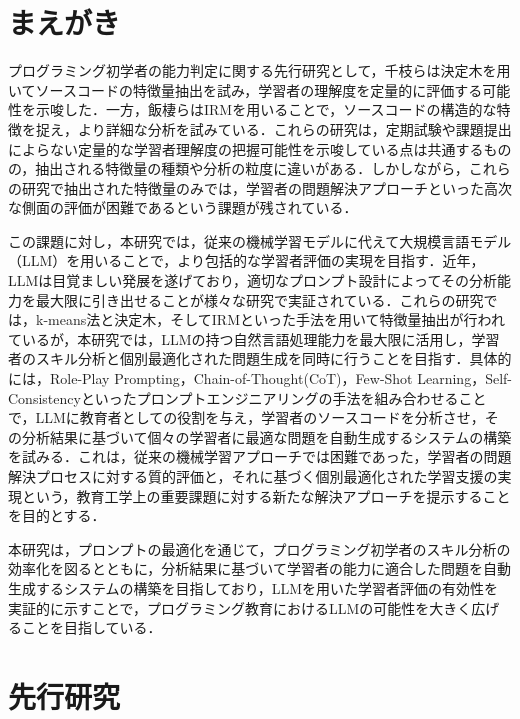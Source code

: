 \documentclass[11pt]{jreport}
\begin{document}
\chapter{まえがき}
プログラミング初学者の能力判定に関する先行研究として，千枝ら\cite{chieda}は決定木を用いてソースコードの特徴量抽出を試み，学習者の理解度を定量的に評価する可能性を示唆した．一方，飯棲ら\cite{izumi}はIRMを用いることで，ソースコードの構造的な特徴を捉え，より詳細な分析を試みている．これらの研究は，定期試験や課題提出によらない定量的な学習者理解度の把握可能性を示唆している点は共通するものの，抽出される特徴量の種類や分析の粒度に違いがある．しかしながら，これらの研究で抽出された特徴量のみでは，学習者の問題解決アプローチといった高次な側面の評価が困難であるという課題が残されている．

この課題に対し，本研究では，従来の機械学習モデルに代えて大規模言語モデル（LLM）を用いることで，より包括的な学習者評価の実現を目指す．近年，LLMは目覚ましい発展を遂げており，適切なプロンプト設計によってその分析能力を最大限に引き出せることが様々な研究で実証されている\cite{prompting servey}．これらの研究では，k-means法と決定木，そしてIRMといった手法を用いて特徴量抽出が行われているが，本研究では，LLMの持つ自然言語処理能力を最大限に活用し，学習者のスキル分析と個別最適化された問題生成を同時に行うことを目指す．具体的には，Role-Play Prompting\cite{Role_play}，Chain-of-Thought(CoT)\cite{CoT}，Few-Shot Learning\cite{Few-shot}，Self-Consistency\cite{Self-consitency}といったプロンプトエンジニアリングの手法を組み合わせることで，LLMに教育者としての役割を与え，学習者のソースコードを分析させ，その分析結果に基づいて個々の学習者に最適な問題を自動生成するシステムの構築を試みる．これは，従来の機械学習アプローチでは困難であった，学習者の問題解決プロセスに対する質的評価と，それに基づく個別最適化された学習支援の実現という，教育工学上の重要課題に対する新たな解決アプローチを提示することを目的とする．

本研究は，プロンプトの最適化を通じて，プログラミング初学者のスキル分析の効率化を図るとともに，分析結果に基づいて学習者の能力に適合した問題を自動生成するシステムの構築を目指しており，LLMを用いた学習者評価の有効性を実証的に示すことで，プログラミング教育におけるLLMの可能性を大きく広げることを目指している．

\chapter{先行研究}
\end{document}
